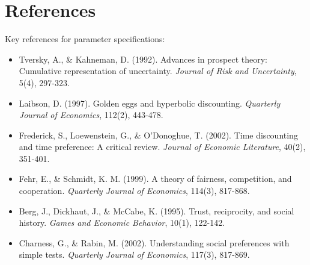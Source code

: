 \section{References}
\label{sec:vc-references}

\nocite{bcm_master}

Key references for parameter specifications:

\begin{itemize}
    \item Tversky, A., \& Kahneman, D. (1992). Advances in prospect theory: Cumulative representation of uncertainty. \textit{Journal of Risk and Uncertainty}, 5(4), 297-323.

    \item Laibson, D. (1997). Golden eggs and hyperbolic discounting. \textit{Quarterly Journal of Economics}, 112(2), 443-478.

    \item Frederick, S., Loewenstein, G., \& O'Donoghue, T. (2002). Time discounting and time preference: A critical review. \textit{Journal of Economic Literature}, 40(2), 351-401.

    \item Fehr, E., \& Schmidt, K. M. (1999). A theory of fairness, competition, and cooperation. \textit{Quarterly Journal of Economics}, 114(3), 817-868.

    \item Berg, J., Dickhaut, J., \& McCabe, K. (1995). Trust, reciprocity, and social history. \textit{Games and Economic Behavior}, 10(1), 122-142.

    \item Charness, G., \& Rabin, M. (2002). Understanding social preferences with simple tests. \textit{Quarterly Journal of Economics}, 117(3), 817-869.
\end{itemize}

